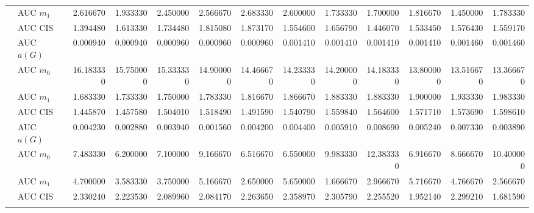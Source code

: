 \begin{table}[htbp]
\begin{tabular}{llrrrrrrrrrrr}
    & AUC $m_1$ & 2.616670 & 1.933330 & 2.450000 & 2.566670 & 2.683330 & 2.600000 & 1.733330 & 1.700000 & 1.816670 & 1.450000 & 1.783330 \\
    & AUC CIS & 1.394480 & 1.613330 & 1.734480 & 1.815080 & 1.873170 & 1.554600 & 1.656790 & 1.446070 & 1.533450 & 1.576430 & 1.559170 \\
    \addlinespace
    \multirow{4}{*}{degree} & AUC $a(G)$ & 0.000940 & 0.000940 & 0.000960 & 0.000960 & 0.000960 & 0.001410 & 0.001410 & 0.001410 & 0.001410 & 0.001460 & 0.001460 \\
    & AUC $m_0$ & 16.183330 & 15.750000 & 15.333330 & 14.900000 & 14.466670 & 14.233330 & 14.200000 & 14.183330 & 13.800000 & 13.516670 & 13.366670 \\
    & AUC $m_1$ & 1.683330 & 1.733330 & 1.750000 & 1.783330 & 1.816670 & 1.866670 & 1.883330 & 1.883330 & 1.900000 & 1.933330 & 1.983330 \\
    & AUC CIS & 1.445870 & 1.457580 & 1.504010 & 1.518490 & 1.491590 & 1.540790 & 1.559840 & 1.564600 & 1.571710 & 1.573690 & 1.598610 \\
    \addlinespace
    \multirow{4}{*}{random} & AUC $a(G)$ & 0.004230 & 0.002880 & 0.003940 & 0.001560 & 0.004200 & 0.004400 & 0.005910 & 0.008690 & 0.005240 & 0.007330 & 0.003890 \\
    & AUC $m_0$ & 7.483330 & 6.200000 & 7.100000 & 9.166670 & 6.516670 & 6.550000 & 9.983330 & 12.383330 & 6.916670 & 8.666670 & 10.400000 \\
    & AUC $m_1$ & 4.700000 & 3.583330 & 3.750000 & 5.166670 & 2.650000 & 5.650000 & 1.666670 & 2.966670 & 5.716670 & 4.766670 & 2.566670 \\
    & AUC CIS & 2.330240 & 2.223530 & 2.089960 & 2.084170 & 2.263650 & 2.358970 & 2.305790 & 2.255520 & 1.952140 & 2.299210 & 1.681590 \\
    \addlinespace
    \bottomrule
  \end{tabular}
\end{table}

